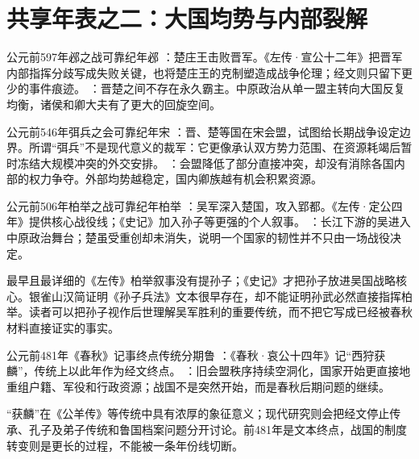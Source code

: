 \section{共享年表之二：大国均势与内部裂解}

\begin{event}{公元前597年}{邲之战}{可靠纪年}{邲}
：楚庄王击败晋军。《左传·宣公十二年》把晋军内部指挥分歧写成失败关键，也将楚庄王的克制塑造成战争伦理；经文则只留下更少的事件痕迹。
：晋楚之间不存在永久霸主。中原政治从单一盟主转向大国反复均衡，诸侯和卿大夫有了更大的回旋空间。
\end{event}

\begin{event}{公元前546年}{弭兵之会}{可靠纪年}{宋}
：晋、楚等国在宋会盟，试图给长期战争设定边界。所谓“弭兵”不是现代意义的裁军：它更像承认双方势力范围、在资源耗竭后暂时冻结大规模冲突的外交安排。
：会盟降低了部分直接冲突，却没有消除各国内部的权力争夺。外部均势越稳定，国内卿族越有机会积累资源。
\end{event}

\begin{event}{公元前506年}{柏举之战}{可靠纪年}{柏举}
：吴军深入楚国，攻入郢都。《左传·定公四年》提供核心战役线；《史记》加入孙子等更强的个人叙事。
：长江下游的吴进入中原政治舞台；楚虽受重创却未消失，说明一个国家的韧性并不只由一场战役决定。
\end{event}

\begin{debate}[孙子在柏举到底扮演了什么角色]
最早且最详细的《左传》柏举叙事没有提孙子；《史记》才把孙子放进吴国战略核心。银雀山汉简证明《孙子兵法》文本很早存在，却不能证明孙武必然直接指挥柏举。读者可以把孙子视作后世理解吴军胜利的重要传统，而不把它写成已经被春秋材料直接证实的事实。
\end{debate}

\begin{event}{公元前481年}{《春秋》记事终点}{传统分期}{鲁}
：《春秋·哀公十四年》记“西狩获麟”，传统上以此年作为经文终点。
：旧会盟秩序持续空洞化，国家开始更直接地重组户籍、军役和行政资源；战国不是突然开始，而是春秋后期问题的继续。
\end{event}

\begin{debate}[481年不是一条天然的历史分界线]
“获麟”在《公羊传》等传统中具有浓厚的象征意义；现代研究则会把经文停止传承、孔子及弟子传统和鲁国档案问题分开讨论。前481年是文本终点，战国的制度转变则是更长的过程，不能被一条年份线切断。
\end{debate}
